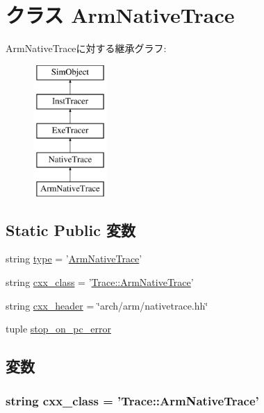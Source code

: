\hypertarget{classArmNativeTrace_1_1ArmNativeTrace}{
\section{クラス ArmNativeTrace}
\label{classArmNativeTrace_1_1ArmNativeTrace}
}
ArmNativeTraceに対する継承グラフ:\begin{figure}[H]
\begin{center}
\leavevmode
\includegraphics[height=5cm]{classArmNativeTrace_1_1ArmNativeTrace}
\end{center}
\end{figure}
\subsection*{Static Public 変数}
\begin{DoxyCompactItemize}
\item 
string \hyperlink{classArmNativeTrace_1_1ArmNativeTrace_acce15679d830831b0bbe8ebc2a60b2ca}{type} = '\hyperlink{classArmNativeTrace_1_1ArmNativeTrace}{ArmNativeTrace}'
\item 
string \hyperlink{classArmNativeTrace_1_1ArmNativeTrace_a58cd55cd4023648e138237cfc0822ae3}{cxx\_\-class} = '\hyperlink{classTrace_1_1ArmNativeTrace}{Trace::ArmNativeTrace}'
\item 
string \hyperlink{classArmNativeTrace_1_1ArmNativeTrace_a17da7064bc5c518791f0c891eff05fda}{cxx\_\-header} = \char`\"{}arch/arm/nativetrace.hh\char`\"{}
\item 
tuple \hyperlink{classArmNativeTrace_1_1ArmNativeTrace_a537ebf35caf142e3300d5be26feb06f9}{stop\_\-on\_\-pc\_\-error}
\end{DoxyCompactItemize}


\subsection{変数}
\hypertarget{classArmNativeTrace_1_1ArmNativeTrace_a58cd55cd4023648e138237cfc0822ae3}{
\subsubsection[{cxx\_\-class}]{\setlength{\rightskip}{0pt plus 5cm}string {\bf cxx\_\-class} = '{\bf Trace::ArmNativeTrace}'}}
\label{classArmNativeTrace_1_1ArmNativeTrace_a58cd55cd4023648e138237cfc0822ae3}


